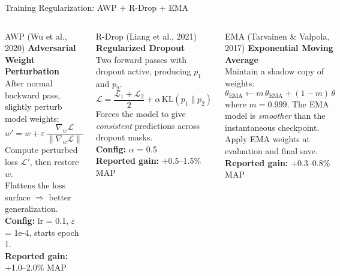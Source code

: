 \documentclass[aspectratio=169]{beamer}
\begin{document}
\begin{frame}{Training Regularization: AWP + R-Drop + EMA}
\begin{columns}[T]
\begin{block}{AWP (Wu et al., 2020)}
\textbf{Adversarial Weight Perturbation}\\[4pt]
After normal backward pass, slightly perturb model weights:
\[
  w' = w + \varepsilon\,\frac{\nabla_w \mathcal{L}}{\|\nabla_w \mathcal{L}\|}
\]
Compute perturbed loss $\mathcal{L}'$, then restore $w$.\\[4pt]
Flattens the loss surface $\Rightarrow$ better generalization.\\[4pt]
\textbf{Config:} lr = 0.1, $\varepsilon$ = 1e-4, starts epoch 1.\\[4pt]
\textbf{Reported gain:} +1.0--2.0\% MAP
\end{block}
\begin{block}{R-Drop (Liang et al., 2021)}
\textbf{Regularized Dropout}\\[4pt]
Two forward passes with dropout active, producing $p_1$ and $p_2$.
\[
  \mathcal{L} = \frac{\mathcal{L}_1 + \mathcal{L}_2}{2} + \alpha\, \text{KL}(p_1 \| p_2)
\]
Forces the model to give \textit{consistent} predictions across dropout masks.\\[4pt]
\textbf{Config:} $\alpha$ = 0.5\\[4pt]
\textbf{Reported gain:} +0.5--1.5\% MAP
\end{block}
\begin{block}{EMA (Tarvainen \& Valpola, 2017)}
\textbf{Exponential Moving Average}\\[4pt]
Maintain a shadow copy of weights:
\[
  \theta_{\text{EMA}} \leftarrow m\,\theta_{\text{EMA}} + (1-m)\,\theta
\]
where $m = 0.999$. The EMA model is \textit{smoother} than the instantaneous checkpoint.\\[4pt]
Apply EMA weights at evaluation and final save.\\[4pt]
\textbf{Reported gain:} +0.3--0.8\% MAP
\end{block}
\end{columns}
\end{frame}
\end{document}
